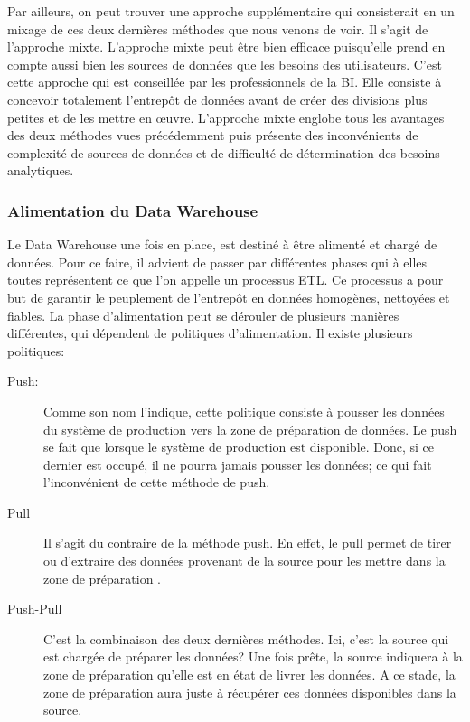 \documentclass[12pt,a4wide,twoside]{report}
\begin{document}
Par ailleurs, on peut trouver une approche supplémentaire qui consisterait en un mixage de ces deux dernières méthodes que nous venons de voir. Il s'agit de l'approche mixte.\newline
L'approche mixte peut être bien efficace puisqu'elle prend en compte aussi bien les sources de données que les besoins des utilisateurs. C'est cette approche qui est conseillée par les professionnels de la BI. Elle consiste à concevoir totalement l'entrepôt de données avant de créer des divisions plus petites et de les mettre en œuvre.\newline
L'approche mixte englobe tous les avantages des deux méthodes vues précédemment puis présente des inconvénients de complexité de sources de données et de difficulté de détermination des besoins analytiques.
\subsubsection{Alimentation du Data Warehouse}
Le Data Warehouse une fois en place, est destiné à être alimenté et chargé de données. Pour ce faire, il advient de passer par différentes phases qui à elles toutes représentent ce que l'on appelle un processus ETL.\newline 
Ce processus a pour but de garantir le peuplement de l'entrepôt en données homogènes, nettoyées et fiables.\newline
La phase d'alimentation peut se dérouler de plusieurs manières différentes, qui dépendent de politiques d'alimentation. Il existe plusieurs politiques:
\begin{description}
	\item[Push: ]Comme son nom l'indique, cette politique consiste à pousser les données du système de production vers la zone de préparation de données. Le push se fait que lorsque le système de production est disponible. Donc, si ce dernier est occupé, il ne pourra jamais pousser les données; ce qui fait l'inconvénient de cette méthode de push.
	\item[Pull ]Il s'agit du contraire de la méthode push. En effet, le pull permet de tirer ou d'extraire des données provenant de la source pour les mettre dans la zone de préparation .
	\item[Push-Pull ]C'est la combinaison des deux dernières méthodes. Ici, c'est la source qui est chargée de préparer les données? Une fois prête, la source indiquera à la zone de préparation qu'elle est en état de livrer les données. A ce stade, la zone de préparation aura juste à récupérer ces données disponibles dans la source.
\end{description}
\end{document}
